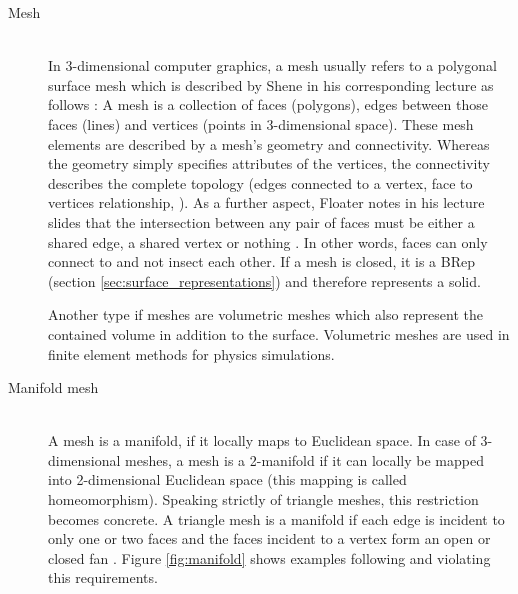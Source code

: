 \begin{description}
	
	\item[Mesh] \hfill \\
	In 3-dimensional computer graphics, a mesh usually refers to a polygonal surface mesh which is described by Shene in his corresponding lecture as follows \cite{mesh_basics}:
	A mesh is a collection of faces (\ie polygons), edges between those faces (\ie lines) and vertices (\ie points in 3-dimensional space).
	These mesh elements are described by a mesh's geometry and connectivity.
	Whereas the geometry simply specifies attributes of the vertices, the connectivity describes the complete topology (\eg edges connected to a vertex, face to vertices relationship, \etc).
	As a further aspect, Floater notes in his lecture slides that the intersection between any pair of faces must be either a shared edge, a shared vertex or nothing \cite{mesh_lecture10}.
	In other words, faces can only connect to and not insect each other.
	If a mesh is closed, it is a BRep (\cf section \ref{sec:surface_representations}) and therefore represents a solid.
	
	Another type if meshes are volumetric meshes which also represent the contained volume in addition to the surface.
	Volumetric meshes are used \eg in finite element methods for physics simulations.
	
	
	\item[Manifold mesh] \hfill \\
	A mesh is a manifold, if it locally maps to Euclidean space.
	In case of 3-dimensional meshes, a mesh is a 2-manifold if it can locally be mapped into 2-dimensional Euclidean space (this mapping is called homeomorphism).
	Speaking strictly of triangle meshes, this restriction becomes concrete.
	A triangle mesh is a manifold if each edge is incident to only one or two faces and the faces incident to a vertex form an open or closed fan \cite{mesh_basics}.
	Figure \ref{fig:manifold} shows examples following and violating this requirements.
	

\end{description}
